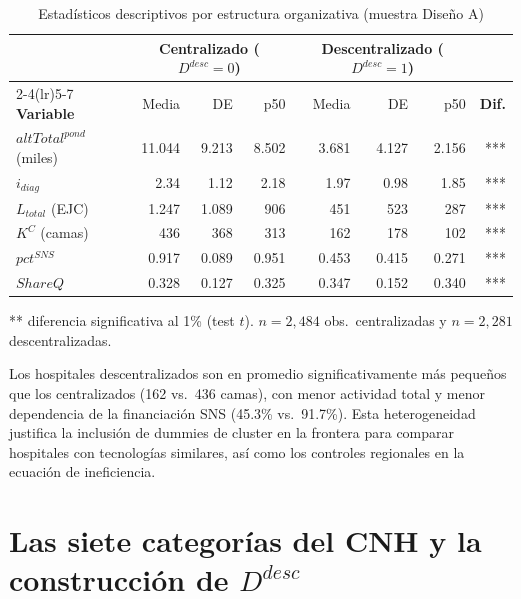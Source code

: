 \begin{table}[htbp]
\centering
\caption{Estadísticos descriptivos por estructura organizativa (muestra Diseño A)}
\label{tab:descriptivos}
\begin{threeparttable}
\small
\begin{tabular}{lrrrrrrr}
\toprule
& \multicolumn{3}{c}{\textbf{Centralizado ($D^{desc}=0$)}}
& \multicolumn{3}{c}{\textbf{Descentralizado ($D^{desc}=1$)}} & \\
\cmidrule(lr){2-4}\cmidrule(lr){5-7}
\textbf{Variable} & Media & DE & p50
  & Media & DE & p50 & \textbf{Dif.} \\
\midrule
$altTotal^{pond}$ (miles) & 11.044 & 9.213 & 8.502
  & 3.681 & 4.127 & 2.156 & *** \\
$i_{diag}$ & 2.34 & 1.12 & 2.18
  & 1.97 & 0.98 & 1.85 & *** \\
$L_{total}$ (EJC) & 1.247 & 1.089 & 906
  & 451 & 523 & 287 & *** \\
$K^C$ (camas) & 436 & 368 & 313
  & 162 & 178 & 102 & *** \\
$pct^{SNS}$ & 0.917 & 0.089 & 0.951
  & 0.453 & 0.415 & 0.271 & *** \\
$ShareQ$ & 0.328 & 0.127 & 0.325
  & 0.347 & 0.152 & 0.340 & *** \\
\bottomrule
\end{tabular}
\begin{tablenotes}
  \small
  \item *** diferencia significativa al 1\% (test $t$). $n = 2{,}484$ obs.\ centralizadas y $n = 2{,}281$ descentralizadas.
\end{tablenotes}
\end{threeparttable}
\end{table}

Los hospitales descentralizados son en promedio significativamente más pequeños que los centralizados (162 vs.\ 436 camas), con menor actividad total y menor dependencia de la financiación SNS (45.3\% vs.\ 91.7\%). Esta heterogeneidad justifica la inclusión de dummies de cluster en la frontera para comparar hospitales con tecnologías similares, así como los controles regionales en la ecuación de ineficiencia.

\section{Las siete categorías del CNH y la construcción de \texorpdfstring{$D^{desc}$}{D\^{}desc}}
\label{sec:categorias_cnh}

